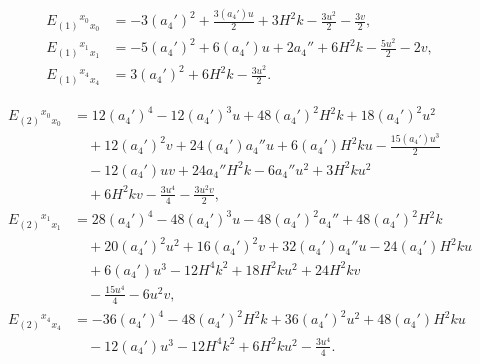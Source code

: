 \documentclass[11pt]{article}
\begin{document}
\[
\begin{aligned}
E_{(1)}{}^{x_0}{}_{x_0} &= -3 (a_4')^2+\frac{3 (a_4') u}{2}+3 H^2 k-\frac{3 u^2}{2}-\frac{3 v}{2}, \\
E_{(1)}{}^{x_1}{}_{x_1} &= -5 (a_4')^2+6 (a_4') u+2 a_4''+6 H^2 k-\frac{5 u^2}{2}-2 v, \\
E_{(1)}{}^{x_4}{}_{x_4} &= 3 (a_4')^2+6 H^2 k-\frac{3 u^2}{2}.
\end{aligned}
\]

\[
\begin{aligned}
E_{(2)}{}^{x_0}{}_{x_0} &= 12 (a_4')^4-12 (a_4')^3 u+48 (a_4')^2 H^2 k+18 (a_4')^2 u^2 \\
&\quad +12 (a_4')^2 v+24 (a_4') a_4'' u+6 (a_4') H^2 k u-\frac{15 (a_4') u^3}{2} \\
&\quad -12 (a_4') u v+24 a_4'' H^2 k-6 a_4'' u^2+3 H^2 k u^2 \\
&\quad +6 H^2 k v-\frac{3 u^4}{4}-\frac{3 u^2 v}{2}, \\
E_{(2)}{}^{x_1}{}_{x_1} &= 28 (a_4')^4-48 (a_4')^3 u-48 (a_4')^2 a_4''+48 (a_4')^2 H^2 k \\
&\quad +20 (a_4')^2 u^2+16 (a_4')^2 v+32 (a_4') a_4'' u-24 (a_4') H^2 k u \\
&\quad +6 (a_4') u^3-12 H^4 k^2+18 H^2 k u^2+24 H^2 k v \\
&\quad -\frac{15 u^4}{4}-6 u^2 v, \\
E_{(2)}{}^{x_4}{}_{x_4} &= -36 (a_4')^4-48 (a_4')^2 H^2 k+36 (a_4')^2 u^2+48 (a_4') H^2 k u \\
&\quad -12 (a_4') u^3-12 H^4 k^2+6 H^2 k u^2-\frac{3 u^4}{4}.
\end{aligned}
\]
\end{document}
